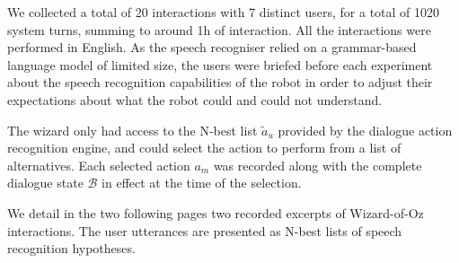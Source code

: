 We collected a total of 20 interactions with 7 distinct users, for a total of 1020 system turns, summing to around 1h of interaction.  All the interactions were performed in English.  As the speech recogniser relied on a grammar-based language model of limited size, the users were briefed before each experiment about the speech recognition capabilities of the robot in order to adjust their expectations about what the robot could and could not understand. 

The wizard only had access to the N-best list $\tilde{a}_u$ provided by the dialogue action recognition engine, and could select the action to perform from a list of alternatives.  Each selected action $a_m$ was recorded along with the complete dialogue state $\mathcal{B}$ in effect at the time of the selection.

We detail in the two following pages two recorded excerpts of Wizard-of-Oz interactions.  The user utterances are presented as N-best lists of speech recognition hypotheses. 

